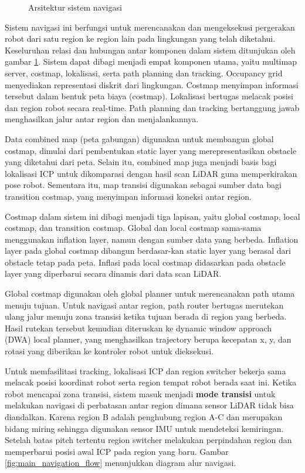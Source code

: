 ﻿
\begin{figure}[H]
\centering

\caption{Arsitektur sistem navigasi}
\label{fig:arsitektur_navigasi}
\end{figure}

Sistem navigasi ini berfungsi untuk merencanakan dan mengeksekusi
pergerakan robot dari satu region ke region lain pada lingkungan yang
telah diketahui. Keseluruhan relasi dan hubungan antar komponen dalam sistem ditunjukan oleh gambar \ref{fig:arsitektur_navigasi}. Sistem dapat dibagi menjadi empat komponen utama,
yaitu multimap server, costmap, lokalisasi, serta path planning dan
tracking. Occupancy grid menyediakan representasi diskrit dari
lingkungan. Costmap menyimpan informasi tersebut dalam bentuk peta
biaya (costmap). Lokalisasi bertugas melacak posisi dan region robot
secara real-time. Path planning dan tracking bertanggung jawab
menghasilkan jalur antar region dan menjalankannya. 

Data combined map (peta gabungan) digunakan untuk membangun global
costmap, dimulai dari pembentukan static layer yang merepresentasikan
obstacle yang diketahui dari peta. Selain itu, combined map juga
menjadi basis bagi lokalisasi ICP untuk dikomparasi dengan hasil scan
LiDAR guna memperkirakan pose robot. Sementara itu, map transisi
digunakan sebagai sumber data bagi transition costmap, yang menyimpan
informasi koneksi antar region.

Costmap dalam sistem ini dibagi menjadi tiga lapisan, yaitu global
costmap, local costmap, dan transition costmap. Global dan local
costmap sama-sama menggunakan inflation layer, namun dengan sumber
data yang berbeda. Inflation layer pada global costmap dibangun
berdasar-kan static layer yang berasal dari obstacle tetap pada peta.
Inflasi pada local costmap didasarkan pada obstacle layer yang
diperbarui secara dinamis dari data scan LiDAR.

Global costmap digunakan oleh global planner untuk merencanakan path
utama menuju tujuan. Untuk navigasi antar region, path router bertugas merutekan ulang jalur menuju
zona transisi ketika tujuan berada di region yang berbeda. Hasil
rutekan tersebut kemudian diteruskan ke dynamic window approach (DWA) local planner, yang
menghasilkan trajectory berupa kecepatan x, y, dan rotasi yang
diberikan ke kontroler robot untuk dieksekusi.

Untuk memfasilitasi tracking, lokalisasi ICP dan region switcher bekerja sama melacak posisi koordinat robot serta region tempat robot berada saat ini. Ketika robot mencapai
zona transisi, sistem masuk menjadi \textbf{mode transisi} untuk melakukan navigasi di perbatasan antar region dimana sensor LiDAR tidak bisa diandalkan. Karena region B adalah penghubung region A-C dan merupakan bidang miring sehingga digunakan sensor IMU untuk mendeteksi kemiringan. Setelah batas pitch tertentu region switcher melakukan perpindahan region dan memperbarui posisi awal ICP pada region yang baru. Gambar \ref{fig:main_navigation_flow} menunjukkan diagram alur navigasi.

